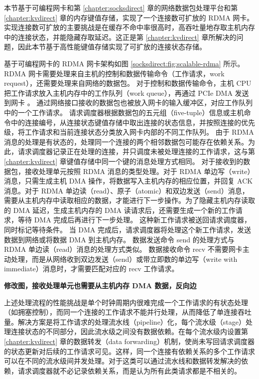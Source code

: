 本节基于可编程网卡和第 \ref{chapter:socksdirect} 章的网络数据包处理平台和第 \ref{chapter:kvdirect} 章的内存键值存储，实现了一个连接数可扩放的 RDMA 网卡。
实现连接数可扩放的主要挑战是在缓存不命中率很高时，高吞吐量地存取主机内存中的连接状态，并能隐藏存取延迟。这正是第 \ref{chapter:kvdirect} 章所解决的问题，因此本节基于高性能键值存储实现了可扩放的连接状态存储。

基于可编程网卡的 RDMA 网卡架构如图 \ref{socksdirect:fig:scalable-rdma} 所示。
RDMA 网卡需要处理来自主机的控制和数据传输命令（工作请求，work request），还需要处理来自网络的数据包。
对于控制和数据传输命令，主机 CPU 把工作请求放入主机内存中的工作队列（work queue），再通过 PCIe DMA 发送到网卡 \cite{kalia2016design}。
通过网络接口接收的数据包也被放入网卡的输入缓冲区，对应工作队列中的一个工作请求。
请求调度器根据数据包的五元组（five-tuple）信息或主机命令中的连接编号，从连接状态键值存储中取出连接的状态信息，并按照连接的优先级，将工作请求和当前连接状态分类放入网卡内部的不同工作队列。
由于 RDMA 消息的处理是有状态的，处理同一个连接的两个相邻数据包可能存在依赖关系。为此，请求调度器记录正在处理的连接，并只调度未被处理连接的工作请求，这与第 \ref{chapter:kvdirect} 章键值存储中同一个键的消息处理方式相同。
对于接收到的数据包，接收处理单元按照 RDMA 消息的类型处理。对于 RDMA 单边写（write）消息，只需生成主机 DMA 操作，将数据写入主机内存的相应位置，并回复 ACK 消息。对于 RDMA 单边读（read）、原子（atomic）和双边发送（send）消息，需要从主机内存中读取相应的数据，才能进行下一步操作。为了隐藏主机内存读取的 DMA 延迟，生成主机内存的 DMA 读请求后，还需要生成一个新的工作请求，等待 DMA 完成后再进行下一步处理。
这种新工作请求被送回请求调度器，同时标记等待条件。
当 DMA 完成后，请求调度器将处理这个新工作请求，发送数据到网络或将数据 DMA 到主机内存。
数据发送命令 send 的处理方式与 RDMA 单边读（read）消息的处理方式类似。
数据接收命令 recv 不需要网卡主动处理，而是从网络收到双边发送（send）或带立即数的单边写（write with immediate）消息时，才需要匹配对应的 recv 工作请求。

\textbf{修改图，接收处理单元也需要从主机内存 DMA 数据，反向边}

上述处理流程的性能挑战是单个时钟周期内很难完成一个工作请求的有状态处理（如拥塞控制），而同一个连接的工作请求不能并行处理，从而降低了单连接吞吐量。解决方案是将工作请求的处理流水线（pipeline）化，每个流水级（stage）处理连接状态的不同部分，因此流水级之间没有数据依赖。在每个流水级内设置第 \ref{chapter:kvdirect} 章的数据转发（data forwarding）机制，使尚未写回请求调度器的状态更新对后续的工作请求可见。这样，同一个连接有依赖关系的多个工作请求可以在不同的流水级间并发处理。对于这类可以通过流水线和数据转发解决的依赖，请求调度器就不必记录依赖关系，而是认为所有此类请求都是不相关的。

